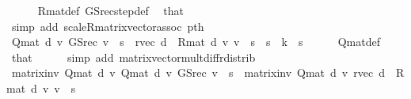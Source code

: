 \begin{isabellebody}
\ \ \ \ \isamarkupfalse%
\ R{\isacharunderscore}{\kern0pt}mat{\isacharunderscore}{\kern0pt}def\ GS{\isacharunderscore}{\kern0pt}rec{\isacharunderscore}{\kern0pt}step{\isacharunderscore}{\kern0pt}def\ \isamarkupfalse%
\ that\isanewline
\ \ \ \ \isamarkupfalse%
\ {\isacharparenleft}{\kern0pt}simp\ add{\isacharcolon}{\kern0pt}\ scaleR{\isacharunderscore}{\kern0pt}matrix{\isacharunderscore}{\kern0pt}vector{\isacharunderscore}{\kern0pt}assoc\ pth{\isacharunderscore}{\kern0pt}{}{\isacharparenright}{\kern0pt}\isanewline
\ \ \isamarkupfalse%
\ {\isachardoublequoteopen}{\isacharparenleft}{\kern0pt}Q{\isacharunderscore}{\kern0pt}mat\ d\ {\isacharasterisk}{\kern0pt}v\ GS{\isacharunderscore}{\kern0pt}rec\ v{\isacharparenright}{\kern0pt}\ {\isachardollar}{\kern0pt}\ s\ {\isacharequal}{\kern0pt}\ {\isacharparenleft}{\kern0pt}r{\isacharunderscore}{\kern0pt}vec\ d\ {\isacharplus}{\kern0pt}\ R{\isacharunderscore}{\kern0pt}mat\ d\ {\isacharasterisk}{\kern0pt}v\ v{\isacharparenright}{\kern0pt}\ {\isachardollar}{\kern0pt}\ s{\isachardoublequoteclose}\ \ {\isachardoublequoteopen}s\ {\isasymle}\ k{\isachardoublequoteclose}\ \ s\isanewline
\ \ \ \ \isamarkupfalse%
\ Q{\isacharunderscore}{\kern0pt}mat{\isacharunderscore}{\kern0pt}def\ \isamarkupfalse%
\ that\isanewline
\ \ \ \ \isamarkupfalse%
\ {\isacharparenleft}{\kern0pt}simp\ add{\isacharcolon}{\kern0pt}\ matrix{\isacharunderscore}{\kern0pt}vector{\isacharunderscore}{\kern0pt}mult{\isacharunderscore}{\kern0pt}diff{\isacharunderscore}{\kern0pt}rdistrib{\isacharparenright}{\kern0pt}\isanewline
\ \ \isamarkupfalse%
\ {\isachardoublequoteopen}{\isacharparenleft}{\kern0pt}matrix{\isacharunderscore}{\kern0pt}inv\ {\isacharparenleft}{\kern0pt}Q{\isacharunderscore}{\kern0pt}mat\ d{\isacharparenright}{\kern0pt}\ {\isacharasterisk}{\kern0pt}v\ {\isacharparenleft}{\kern0pt}Q{\isacharunderscore}{\kern0pt}mat\ d\ {\isacharasterisk}{\kern0pt}v\ GS{\isacharunderscore}{\kern0pt}rec\ v{\isacharparenright}{\kern0pt}{\isacharparenright}{\kern0pt}\ {\isachardollar}{\kern0pt}\ s\ {\isacharequal}{\kern0pt}\ {\isacharparenleft}{\kern0pt}matrix{\isacharunderscore}{\kern0pt}inv\ {\isacharparenleft}{\kern0pt}Q{\isacharunderscore}{\kern0pt}mat\ d{\isacharparenright}{\kern0pt}\ {\isacharasterisk}{\kern0pt}v\ {\isacharparenleft}{\kern0pt}{\isacharparenleft}{\kern0pt}r{\isacharunderscore}{\kern0pt}vec\ d\ {\isacharplus}{\kern0pt}\ R{\isacharunderscore}{\kern0pt}mat\ d\ {\isacharasterisk}{\kern0pt}v\ v{\isacharparenright}{\kern0pt}{\isacharparenright}{\kern0pt}{\isacharparenright}{\kern0pt}\ {\isachardollar}{\kern0pt}\ s{\isachardoublequoteclose}\isanewline

\end{isabellebody}
